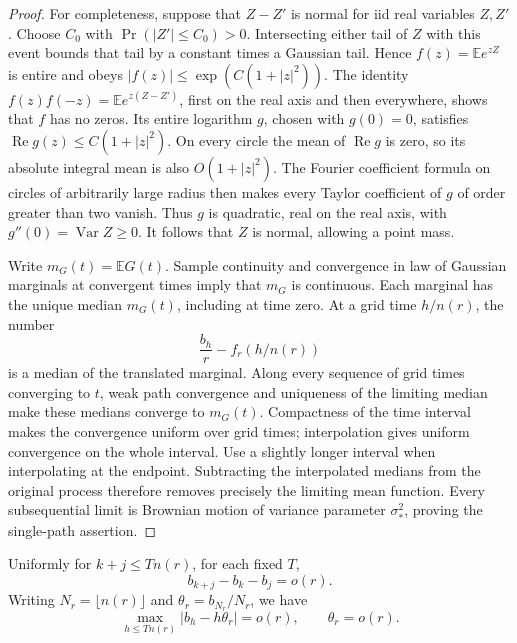\begin{proof}
For completeness, suppose that \(Z-Z'\) is normal for iid real
variables \(Z,Z'\). Choose \(C_0\) with
\(\Pr(|Z'|\le C_0)>0\). Intersecting either tail of \(Z\) with
this event bounds that tail by a constant times a Gaussian tail. Hence
\(f(z)=\mathbb E e^{zZ}\) is entire and obeys
\(|f(z)|\le\exp(C(1+|z|^2))\). The identity
\(f(z)f(-z)=\mathbb E e^{z(Z-Z')}\), first on the real axis and
then everywhere, shows that \(f\) has no zeros. Its entire logarithm
\(g\), chosen with \(g(0)=0\), satisfies
\(\operatorname{Re}g(z)\le C(1+|z|^2)\). On every circle the mean
of \(\operatorname{Re}g\) is zero, so its absolute integral mean is
also \(O(1+|z|^2)\). The Fourier coefficient formula on circles of
arbitrarily large radius then makes every Taylor coefficient of \(g\)
of order greater than two vanish. Thus \(g\) is quadratic, real on
the real axis, with \(g''(0)=\operatorname{Var}Z\ge0\). It follows
that \(Z\) is normal, allowing a point mass.

Write \(m_G(t)=\mathbb E G(t)\). Sample continuity and convergence
in law of Gaussian marginals at convergent times imply that \(m_G\)
is continuous. Each marginal has the unique median \(m_G(t)\),
including at time zero. At a grid time \(h/n(r)\), the number
\[
 \frac{b_h}{r}-f_r(h/n(r))
\]
is a median of the translated marginal. Along every sequence of grid
times converging to \(t\), weak path convergence and uniqueness of
the limiting median make these medians converge to \(m_G(t)\).
Compactness of the time interval makes the convergence uniform over
grid times; interpolation gives uniform convergence on the whole
interval. Use a slightly longer interval when interpolating at the
endpoint. Subtracting the interpolated medians from the original
process therefore removes precisely the limiting mean function.
Every subsequential limit is Brownian motion of variance parameter
\(\sigma_*^2\), proving the single-path assertion.
\end{proof}

\begin{lemma}\label{gauss-medians}
Uniformly for \(k+j\le T n(r)\), for each fixed \(T\),
\[
 b_{k+j}-b_k-b_j=o(r).
 \tag{15}\label{eq:15}
\]
Writing \(N_r=\lfloor n(r)\rfloor\) and
\(\theta_r=b_{N_r}/N_r\), we have
\[
 \max_{h\le Tn(r)}|b_h-h\theta_r|=o(r),
 \qquad \theta_r=o(r).
\]
\end{lemma}

